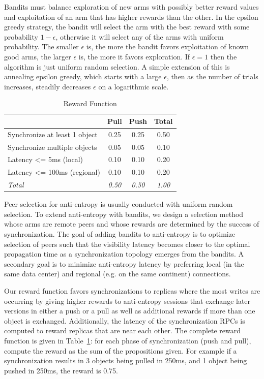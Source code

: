 Bandits must balance exploration of new arms with possibly better reward
values and exploitation of an arm that has higher rewards than the other.
In the epsilon greedy strategy, the bandit will select the arm with the best
reward with some probability $1-\epsilon$, otherwise it will select any of the
arms with uniform probability.
The smaller $\epsilon$ is, the more the bandit favors exploitation of known
good arms, the larger $\epsilon$ is, the more it favors exploration.
If $\epsilon=1$ then the algorithm is just uniform random selection.
A simple extension of this is annealing epsilon greedy, which starts with a large $\epsilon$, then as the number of trials increases, steadily decreases
$\epsilon$ on a logarithmic scale.

\begin{table}[]
\centering
\begin{tabular}{@{}l c c c @{}}
\toprule
& \textbf{Pull} & \textbf{Push} & \textbf{Total} \\
\midrule
Synchronize at least 1 object & 0.25 & 0.25 & 0.50 \\
Synchronize multiple objects  & 0.05 & 0.05 & 0.10 \\
Latency <= 5ms (local)        & 0.10 & 0.10 & 0.20 \\
Latency <= 100ms (regional)   & 0.10 & 0.10 & 0.20 \\
\midrule
\textit{Total} & \textit{0.50} & \textit{0.50} & \textit{1.00} \\
\bottomrule
\end{tabular}
\caption{Reward Function}
\label{tab:rewards}
\end{table}

Peer selection for anti-entropy is usually conducted with uniform random
selection.
To extend anti-entropy with bandits, we design a selection method whose arms
are remote peers and whose rewards are determined by the success of
synchronization.
The goal of adding bandits to anti-entropy is to optimize selection of peers
such that the visibility latency becomes closer to the optimal propagation
time as a synchronization topology emerges from the bandits.
A secondary goal is to minimize anti-entropy latency by preferring local (in
the same data center) and regional (e.g. on the same continent) connections.

Our reward function favors synchronizations to replicas where the most writes
are occurring by giving higher rewards to anti-entropy sessions that exchange
later versions in either a push or a pull as well as additional rewards if
more than one object is exchanged.
Additionally, the latency of the synchronization RPCs is computed to reward
replicas that are near each other.
The complete reward function is given in Table~\ref{tab:rewards}: for each
phase of synchronization (push and pull), compute the reward as the sum of the
propositions given.
For example if a synchronization results in 3 objects being pulled in 250ms,
and 1 object being pushed in 250ms, the reward is 0.75.

